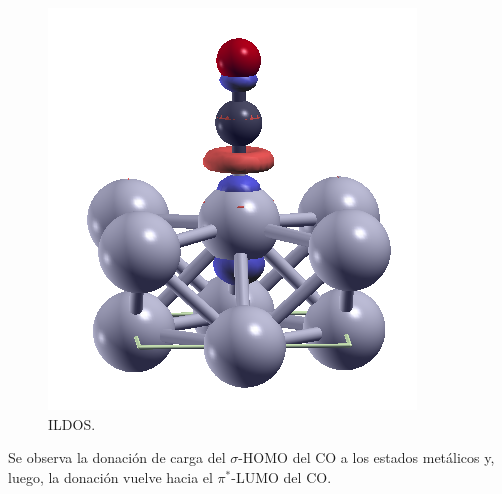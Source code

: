     \begin{figure}[H]
        \centering
        \includegraphics[scale = 0.7]{figs/D3/CO_DIFDEN.png}
        \caption{ILDOS.}
    \end{figure}

    Se observa la donación de carga del $\sigma$-HOMO del CO a los estados metálicos y, luego, la donación vuelve hacia el $\pi^*$-LUMO del CO.
